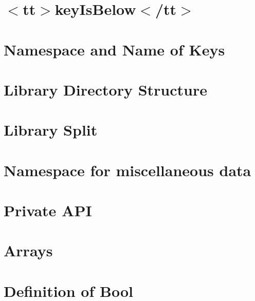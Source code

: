 \let\mypdfximage\pdfximage\def\pdfximage{\immediate\mypdfximage}\documentclass[twoside]{book}
\newcommand{\+}{\discretionary{\mbox{\scriptsize$\hookleftarrow$}}{}{}}
\begin{document}
\chapter{$<$tt$>$key\+Is\+Below$<$/tt$>$}
\label{doc_decisions_4_decided_key_below_md}

\chapter{Namespace and Name of Keys}
\label{doc_decisions_4_decided_keyname_md}

\chapter{Library Directory Structure}
\label{doc_decisions_4_decided_library_directory_structure_md}

\chapter{Library Split}
\label{doc_decisions_4_decided_library_split_md}

\chapter{Namespace for miscellaneous data}
\label{doc_decisions_4_decided_misc_namespace_md}

\chapter{Private API}
\label{doc_decisions_4_decided_private_api_md}

\chapter{Arrays}
\label{doc_decisions_5_partially_implemented_array_md}

\chapter{Definition of Bool}
\label{doc_decisions_5_partially_implemented_boolean_md}

\end{document}
